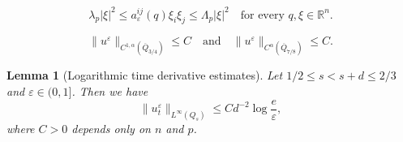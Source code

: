 \documentclass[10pt,a4paper]{amsart}
\newtheorem{lemma}{Lemma}
\begin{document}
\begin{equation}\label{eq:ellipticity}
 \lambda_p|\xi|^2
 \leq a_\varepsilon^{ij}(q)\xi_i\xi_j
 \leq\Lambda_p|\xi|^2
 \quad \text{for every $q,\xi\in\mathbb{R}^n$}.
\end{equation}

\begin{equation}\label{eq:gradient}
    \|u^\varepsilon\|_{C^{1,\alpha}(\overline{Q}_{3/4})}\leq C \quad \text{and}  \quad \|u^\varepsilon\|_{C^\alpha(\overline{Q}_{7/8})}\leq C.
\end{equation}

\begin{lemma}[Logarithmic time derivative estimates]\label{lem:logarithmic}
Let $1/2\leq s<s+d\leq2/3$ and $\varepsilon \in (0,1]$. Then we have
\begin{equation}\label{eq:logarithmic}
 \|u_t^\varepsilon\|_{L^\infty(Q_s)}
 \leq Cd^{-2}\log\frac e\varepsilon,
\end{equation}
where $C>0$ depends only on $n$ and $p$.
\end{lemma}
\end{document}
